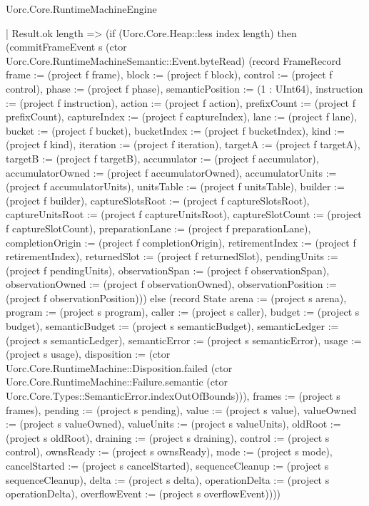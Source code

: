 \begin{lexlean}{Uorc.Core.RuntimeMachineEngine}
\begin{semanticmodule}
{        | Result.ok length => (if (Uorc.Core.Heap::less index length) then (commitFrameEvent s (ctor Uorc.Core.RuntimeMachineSemantic::Event.byteRead) (record FrameRecord {frame := (project f frame), block := (project f block), control := (project f control), phase := (project f phase), semanticPosition := (1 : UInt64), instruction := (project f instruction), action := (project f action), prefixCount := (project f prefixCount), captureIndex := (project f captureIndex), lane := (project f lane), bucket := (project f bucket), bucketIndex := (project f bucketIndex), kind := (project f kind), iteration := (project f iteration), targetA := (project f targetA), targetB := (project f targetB), accumulator := (project f accumulator), accumulatorOwned := (project f accumulatorOwned), accumulatorUnits := (project f accumulatorUnits), unitsTable := (project f unitsTable), builder := (project f builder), captureSlotsRoot := (project f captureSlotsRoot), captureUnitsRoot := (project f captureUnitsRoot), captureSlotCount := (project f captureSlotCount), preparationLane := (project f preparationLane), completionOrigin := (project f completionOrigin), retirementIndex := (project f retirementIndex), returnedSlot := (project f returnedSlot), pendingUnits := (project f pendingUnits), observationSpan := (project f observationSpan), observationOwned := (project f observationOwned), observationPosition := (project f observationPosition)})) else (record State {arena := (project s arena), program := (project s program), caller := (project s caller), budget := (project s budget), semanticBudget := (project s semanticBudget), semanticLedger := (project s semanticLedger), semanticError := (project s semanticError), usage := (project s usage), disposition := (ctor Uorc.Core.RuntimeMachine::Disposition.failed (ctor Uorc.Core.RuntimeMachine::Failure.semantic (ctor Uorc.Core.Types::SemanticError.indexOutOfBounds))), frames := (project s frames), pending := (project s pending), value := (project s value), valueOwned := (project s valueOwned), valueUnits := (project s valueUnits), oldRoot := (project s oldRoot), draining := (project s draining), control := (project s control), ownsReady := (project s ownsReady), mode := (project s mode), cancelStarted := (project s cancelStarted), sequenceCleanup := (project s sequenceCleanup), delta := (project s delta), operationDelta := (project s operationDelta), overflowEvent := (project s overflowEvent)})))
}
\end{semanticmodule}
\end{lexlean}
